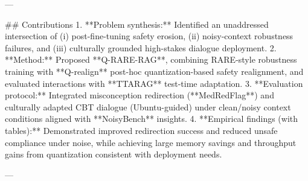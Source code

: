 ---

## Contributions  
1. **Problem synthesis:** Identified an unaddressed intersection of (i) post-fine-tuning safety erosion, (ii) noisy-context robustness failures, and (iii) culturally grounded high-stakes dialogue deployment.  
2. **Method:** Proposed **Q-RARE-RAG**, combining RARE-style robustness training with **Q-realign** post-hoc quantization-based safety realignment, and evaluated interactions with **TTARAG** test-time adaptation.  
3. **Evaluation protocol:** Integrated misconception redirection (**MedRedFlag**) and culturally adapted CBT dialogue (Ubuntu-guided) under clean/noisy context conditions aligned with **NoisyBench** insights.  
4. **Empirical findings (with tables):** Demonstrated improved redirection success and reduced unsafe compliance under noise, while achieving large memory savings and throughput gains from quantization consistent with deployment needs.

---